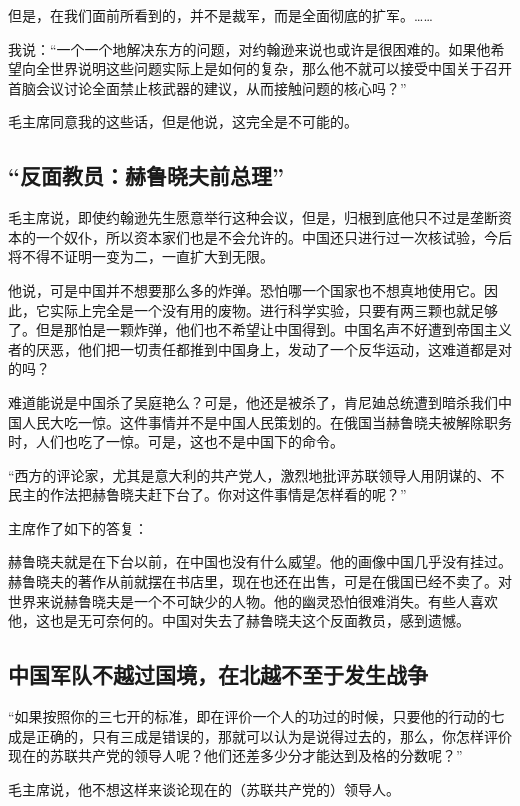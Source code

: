 但是，在我们面前所看到的，并不是裁军，而是全面彻底的扩军。……

我说：“一个一个地解决东方的问题，对约翰逊来说也或许是很困难的。如果他希望向全世界说明这些问题实际上是如何的复杂，那么他不就可以接受中国关于召开首脑会议讨论全面禁止核武器的建议，从而接触问题的核心吗？”

毛主席同意我的这些话，但是他说，这完全是不可能的。

\subsection{“反面教员：赫鲁晓夫前总理”}

毛主席说，即使约翰逊先生愿意举行这种会议，但是，归根到底他只不过是垄断资本的一个奴仆，所以资本家们也是不会允许的。中国还只进行过一次核试验，今后将不得不证明一变为二，一直扩大到无限。

他说，可是中国并不想要那么多的炸弹。恐怕哪一个国家也不想真地使用它。因此，它实际上完全是一个没有用的废物。进行科学实验，只要有两三颗也就足够了。但是那怕是一颗炸弹，他们也不希望让中国得到。中国名声不好遭到帝国主义者的厌恶，他们把一切责任都推到中国身上，发动了一个反华运动，这难道都是对的吗？

难道能说是中国杀了吴庭艳么？可是，他还是被杀了，肯尼廸总统遭到暗杀我们中国人民大吃一惊。这件事情并不是中国人民策划的。在俄国当赫鲁晓夫被解除职务时，人们也吃了一惊。可是，这也不是中国下的命令。

“西方的评论家，尤其是意大利的共产党人，激烈地批评苏联领导人用阴谋的、不民主的作法把赫鲁晓夫赶下台了。你对这件事情是怎样看的呢？”

主席作了如下的答复：

赫鲁晓夫就是在下台以前，在中国也没有什么威望。他的画像中国几乎没有挂过。赫鲁晓夫的著作从前就摆在书店里，现在也还在出售，可是在俄国已经不卖了。对世界来说赫鲁晓夫是一个不可缺少的人物。他的幽灵恐怕很难消失。有些人喜欢他，这也是无可奈何的。中国对失去了赫鲁晓夫这个反面教员，感到遗憾。

\subsection{中国军队不越过国境，在北越不至于发生战争}

“如果按照你的三七开的标准，即在评价一个人的功过的时候，只要他的行动的七成是正确的，只有三成是错误的，那就可以认为是说得过去的，那么，你怎样评价现在的苏联共产党的领导人呢？他们还差多少分才能达到及格的分数呢？”

毛主席说，他不想这样来谈论现在的（苏联共产党的）领导人。

